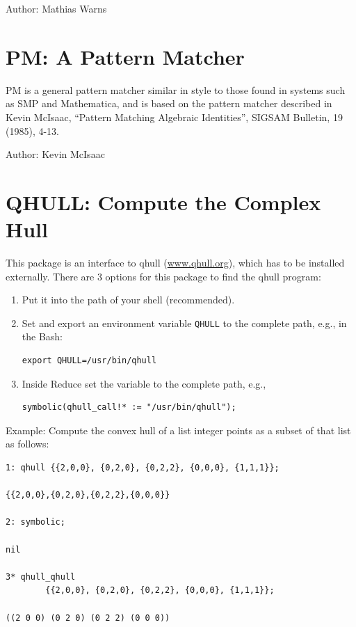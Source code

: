 Author: Mathias Warns



\newpage

\section{PM: A \REDUCE Pattern Matcher}

PM is a general pattern matcher similar in style to those found in systems
such as SMP and Mathematica, and is based on the pattern matcher described
in Kevin McIsaac, ``Pattern Matching Algebraic Identities'', SIGSAM Bulletin,
19 (1985), 4-13.

Author: Kevin McIsaac



\newpage


\section{QHULL: Compute the Complex Hull}



This package is an interface to qhull (\href{http://www.qhull.org}{www.qhull.org}),
which has to be installed externally.  There are 3 options for this
package to find the qhull program:
\begin{enumerate}
\item Put it into the path of your shell (recommended).
\item Set and export an environment variable \texttt{QHULL} to the complete path, e.g., in
the Bash:
\begin{verbatim}
export QHULL=/usr/bin/qhull
\end{verbatim}
\item Inside Reduce set the variable  to the complete path, e.g.,
\begin{verbatim}
symbolic(qhull_call!* := "/usr/bin/qhull");
\end{verbatim}
\end{enumerate}
Example:
Compute the convex hull of a list integer points as a subset
of that list as follows:
\begin{verbatim}
1: qhull {{2,0,0}, {0,2,0}, {0,2,2}, {0,0,0}, {1,1,1}};

{{2,0,0},{0,2,0},{0,2,2},{0,0,0}}

2: symbolic;

nil

3* qhull_qhull
        {{2,0,0}, {0,2,0}, {0,2,2}, {0,0,0}, {1,1,1}};

((2 0 0) (0 2 0) (0 2 2) (0 0 0))
\end{verbatim}

